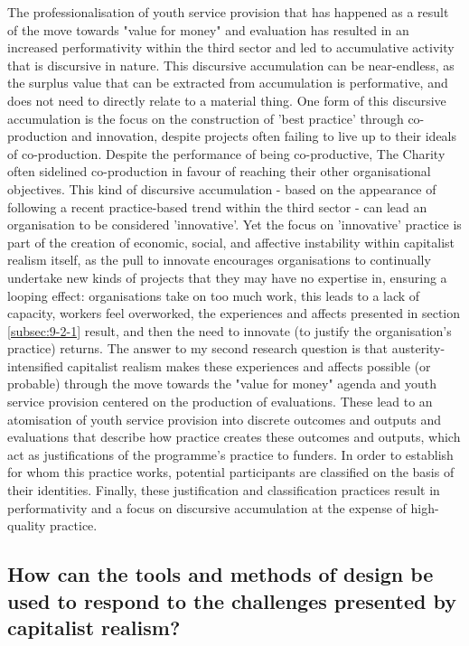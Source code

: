 The professionalisation of youth service provision that has happened as a result of the move towards "value for money" and evaluation has resulted in an increased performativity within the third sector and led to accumulative activity that is discursive in nature. This discursive accumulation can be near-endless, as the surplus value that can be extracted from accumulation is performative, and does not need to directly relate to a material thing. One form of this discursive accumulation is the focus on the construction of 'best practice' through co-production and innovation, despite projects often failing to live up to their ideals of co-production. Despite the performance of being co-productive, The Charity often sidelined co-production in favour of reaching their other organisational objectives. This kind of discursive accumulation - based on the appearance of following a recent practice-based trend within the third sector - can lead an organisation to be considered 'innovative'. Yet the focus on 'innovative' practice is part of the creation of economic, social, and affective instability within capitalist realism itself, as the pull to innovate encourages organisations to continually undertake new kinds of projects that they may have no expertise in, ensuring a looping effect: organisations take on too much work, this leads to a lack of capacity, workers feel overworked, the experiences and affects presented in section \ref{subsec:9-2-1} result, and then the need to innovate (to justify the organisation's practice) returns.  The answer to my second research question is that austerity-intensified capitalist realism makes these experiences and affects possible (or probable) through the move towards the "value for money" agenda and youth service provision centered on the production of evaluations. These lead to an atomisation of youth service provision into discrete outcomes and outputs and evaluations that describe how practice creates these outcomes and outputs, which act as justifications of the programme's practice to funders. In order to establish for whom this practice works, potential participants are classified on the basis of their identities. Finally, these justification and classification practices result in performativity and a focus on discursive accumulation at the expense of high-quality practice. 

\subsection{How can the tools and methods of design be used to respond to the challenges presented by capitalist realism?}




